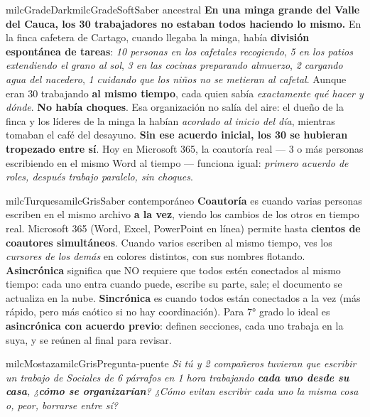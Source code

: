 \documentclass[11pt,letterpaper]{article}
\begin{document}
\begin{softbox}{milcGradeDark}{milcGradeSoft}{Saber ancestral}
\textbf{En una minga grande del Valle del Cauca, los 30 trabajadores no estaban todos haciendo lo mismo.} En la finca cafetera de Cartago, cuando llegaba la minga, había \textbf{división espontánea de tareas}: \emph{10 personas en los cafetales recogiendo}, \emph{5 en los patios extendiendo el grano al sol}, \emph{3 en las cocinas preparando almuerzo}, \emph{2 cargando agua del nacedero}, \emph{1 cuidando que los niños no se metieran al cafetal}. Aunque eran 30 trabajando \textbf{al mismo tiempo}, cada quien sabía \emph{exactamente qué hacer y dónde}. \textbf{No había choques}. Esa organización no salía del aire: el dueño de la finca y los líderes de la minga la habían \emph{acordado al inicio del día}, mientras tomaban el café del desayuno. \textbf{Sin ese acuerdo inicial, los 30 se hubieran tropezado entre sí}. Hoy en Microsoft 365, la coautoría real --- 3 o más personas escribiendo en el mismo Word al tiempo --- funciona igual: \emph{primero acuerdo de roles, después trabajo paralelo, sin choques}.
\end{softbox}

\begin{softbox}{milcTurquesa}{milcGris}{Saber contemporáneo}
\textbf{Coautoría} es cuando varias personas escriben en el mismo archivo \textbf{a la vez}, viendo los cambios de los otros en tiempo real. Microsoft 365 (Word, Excel, PowerPoint en línea) permite hasta \textbf{cientos de coautores simultáneos}. Cuando varios escriben al mismo tiempo, ves los \emph{cursores de los demás} en colores distintos, con sus nombres flotando. \textbf{Asincrónica} significa que NO requiere que todos estén conectados al mismo tiempo: cada uno entra cuando puede, escribe su parte, sale; el documento se actualiza en la nube. \textbf{Sincrónica} es cuando todos están conectados a la vez (más rápido, pero más caótico si no hay coordinación). Para 7° grado lo ideal es \textbf{asincrónica con acuerdo previo}: definen secciones, cada uno trabaja en la suya, y se reúnen al final para revisar.
\end{softbox}

\begin{softbox}{milcMostaza}{milcGris}{Pregunta-puente}
\textit{Si tú y 2 compañeros tuvieran que escribir un trabajo de Sociales de 6 párrafos en 1 hora trabajando \textbf{cada uno desde su casa}, ¿\textbf{cómo se organizarían}? ¿Cómo evitan escribir cada uno la misma cosa o, peor, borrarse entre sí?}
\end{softbox}
\end{document}
